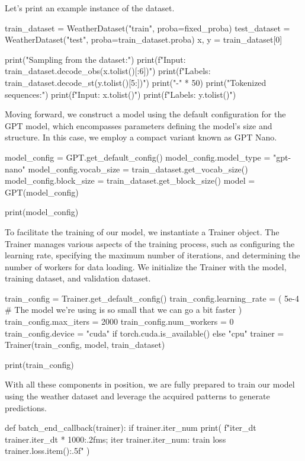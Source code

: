 \begin{exercise}
\begin{python}
\end{python}

Let's print an example instance of the dataset.
\begin{python}
train_dataset = WeatherDataset("train", proba=fixed_proba)
test_dataset = WeatherDataset("test", proba=train_dataset.proba)
x, y = train_dataset[0]

print("Sampling from the dataset:")
print(f"Input: {train_dataset.decode_obs(x.tolist()[:6])}")
print(f"Labels: {train_dataset.decode_st(y.tolist()[5:])}")
print("-" * 50)
print("Tokenized sequences:")
print(f"Input: {x.tolist()}")
print(f"Labels: {y.tolist()}")
\end{python}

Moving forward, we construct a model using the default configuration for the GPT model, which encompasses parameters defining the model's size and structure. In this case, we employ a compact variant known as GPT Nano.

\begin{python}
model_config = GPT.get_default_config()
model_config.model_type = "gpt-nano"
model_config.vocab_size = train_dataset.get_vocab_size()
model_config.block_size = train_dataset.get_block_size()
model = GPT(model_config)

print(model_config)
\end{python}

To facilitate the training of our model, we instantiate a Trainer object. The Trainer manages various aspects of the training process, such as configuring the learning rate, specifying the maximum number of iterations, and determining the number of workers for data loading. We initialize the Trainer with the model, training dataset, and validation dataset.

\begin{python}
train_config = Trainer.get_default_config()
train_config.learning_rate = (
    5e-4  # The model we're using is so small that we can go a bit faster
)
train_config.max_iters = 2000
train_config.num_workers = 0
train_config.device = "cuda" if torch.cuda.is_available() else "cpu"
trainer = Trainer(train_config, model, train_dataset)

print(train_config)
\end{python}

With all these components in position, we are fully prepared to train our model using the weather dataset and leverage the acquired patterns to generate predictions.

\begin{python}
def batch_end_callback(trainer):
    if trainer.iter_num %
        print(
            f"iter_dt {trainer.iter_dt * 1000:.2f}ms; iter {trainer.iter_num}: train loss {trainer.loss.item():.5f}"
        )



\end{python}
\end{exercise}
